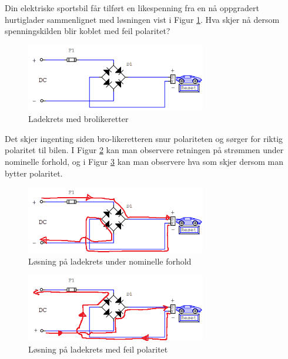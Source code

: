\begin{question}[name=Oppgave, topic=dioder]
	Din elektriske sportsbil får tilført en likespenning fra en nå oppgradert hurtiglader sammenlignet med løsningen vist i Figur \ref{fig:diodeLadingG}. Hva skjer nå dersom spenningskilden blir koblet med feil polaritet?
	
	\begin{figure}[H]
		\centering
		\includegraphics[width=0.7\textwidth]{diode/figurer/GretzLading.png}
		\caption{Ladekrets med brolikeretter}
		\label{fig:diodeLadingG}
	\end{figure}
	
\end{question}

\vspace{0.5cm} %

\begin{solution}[name=Løsningsforslag oppgave]
Det skjer ingenting siden bro-likeretteren snur polariteten og sørger for riktig polaritet til bilen. I Figur \ref{fig:BroLadingSol} kan man observere retningen på strømmen under nominelle forhold, og i Figur \ref{fig:BroLadingSol2} kan man observere hva som skjer dersom man bytter polaritet.

\begin{figure}[H]
	\centering
	\includegraphics[width=0.7\textwidth]{diode/figurer/GretzLadingVanlig-SOL.png}
	\caption{Løsning på ladekrets under nominelle forhold}
	\label{fig:BroLadingSol}
\end{figure}
	
\begin{figure}[H]
	\centering
	\includegraphics[width=0.7\textwidth]{diode/figurer/GretzLadingFeil-SOL.png}
	\caption{Løsning på ladekrets med feil polaritet}
	\label{fig:BroLadingSol2}
\end{figure}	
	
	
\end{solution}





